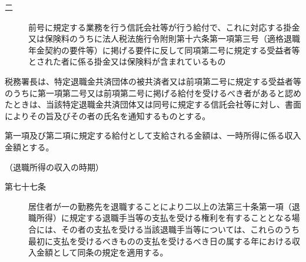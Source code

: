 \documentclass[twocolumn,a4j,10pt]{ltjtarticle}
\begin{document}
\begin{description}
\begin{description}
\item[二]前号に規定する業務を行う信託会社等が行う給付で、これに対応する掛金又は保険料のうちに法人税法施行令附則第十六条第一項第三号（適格退職年金契約の要件等）に掲げる要件に反して同項第二号に規定する受益者等とされた者に係る掛金又は保険料が含まれているもの
\end{description}
\item[\rensuji{3}]税務署長は、特定退職金共済団体の被共済者又は前項第二号に規定する受益者等のうちに第一項第二号又は前項第二号に掲げる給付を受けるべき者があると認めたときは、当該特定退職金共済団体又は同号に規定する信託会社等に対し、書面によりその旨及びその者の氏名を通知するものとする。
\item[\rensuji{4}]第一項及び第二項に規定する給付として支給される金額は、一時所得に係る収入金額とする。
\end{description}
\noindent\hspace{10pt}（退職所得の収入の時期）
\begin{description}
\item[第七十七条]居住者が一の勤務先を退職することにより二以上の法第三十条第一項（退職所得）に規定する退職手当等の支払を受ける権利を有することとなる場合には、その者の支払を受ける当該退職手当等については、これらのうち最初に支払を受けるべきものの支払を受けるべき日の属する年における収入金額として同条の規定を適用する。
\end{description}
\end{document}
